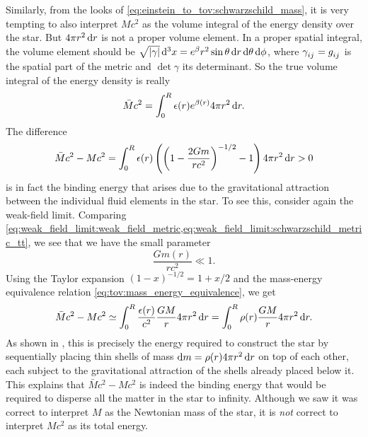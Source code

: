 Similarly, from the looks of \cref{eq:einstein_to_tov:schwarzschild_mass}, it is very tempting to also interpret $M c^2$ as the volume integral of the energy density over the star.
But $4 \pi r^2 \dif r$ is not a proper volume element.
In a proper spatial integral, the volume element should be $\sqrt{\det{\gamma}} \dif^3 x = e^\beta r^2 \sin \theta \dif r \dif \theta \dif \phi$, where $\gamma\indices{_i_j} = g\indices{_i_j}$ is the spatial part of the metric and $\det{\gamma}$ its determinant.
So the true volume integral of the energy density is really
\begin{equation*}
	\bar{M} c^2 = \integral{\epsilon(r) e^{\beta(r)} 4 \pi r^2}{r}{0}{R} .
\end{equation*}
The difference
\begin{equation*}
	\bar{M} c^2 - M c^2 = \integral{\epsilon(r) \left( \left( 1-\frac{2Gm}{rc^2} \right)^{-1/2} - 1 \right) 4 \pi r^2}{r}{0}{R} > 0
\end{equation*}
is in fact the binding energy that arises due to the gravitational attraction between the individual fluid elements in the star.
To see this, consider again the weak-field limit.
Comparing \cref{eq:weak_field_limit:weak_field_metric,eq:weak_field_limit:schwarzschild_metric_tt}, we see that we have the small parameter
\begin{equation}
	\frac{G m(r)}{rc^2} \ll 1 .
	\label{eq:weak_field_limit:small_gmr}
\end{equation}
Using the Taylor expansion $(1 - x)^{-1/2} = 1 + x/2$ and the mass-energy equivalence relation \eqref{eq:tov:mass_energy_equivalence}, we get
\begin{equation}
	\bar{M} c^2 - M c^2 \taylor \integral{\frac{\epsilon(r)}{c^2} \frac{GM}{r} 4 \pi r^2}{r}{0}{R}
	                    =       \integral{\rho(r) \frac{GM}{r} 4 \pi r^2}{r}{0}{R} .
\end{equation}
As shown in \cite[exercise 23.7]{ref:mtw}, this is precisely the energy required to construct the star by sequentially placing thin shells of mass $\dif m = \rho(r) 4 \pi r^2 \dif r$ on top of each other, each subject to the gravitational attraction of the shells already placed below it.
This explains that $\bar{M} c^2 - M c^2$ is indeed the binding energy that would be required to disperse all the matter in the star to infinity.
Although we saw it was correct to interpret $M$ as the Newtonian mass of the star, it is \emph{not} correct to interpret $Mc^2$ as its total energy.

